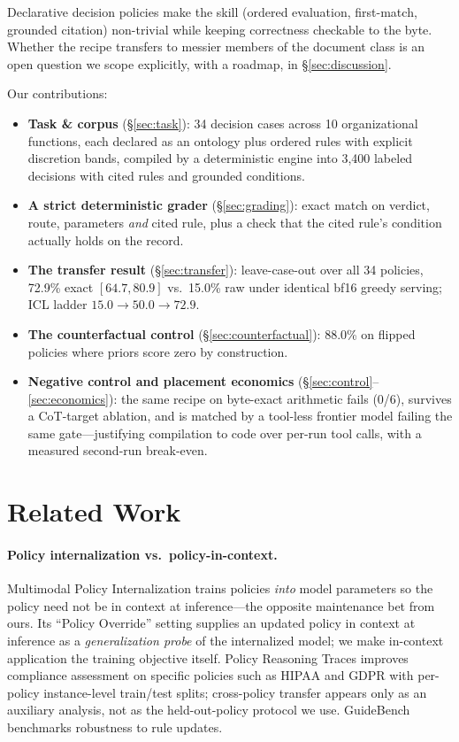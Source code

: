\documentclass[11pt]{article}
\begin{document}
Declarative decision policies make the skill (ordered evaluation, first-match, grounded citation) non-trivial while keeping correctness checkable to the byte. Whether the recipe transfers to messier members of the document class is an open question we scope explicitly, with a roadmap, in \S\ref{sec:discussion}.

Our contributions:
\begin{itemize}
  \item \textbf{Task \& corpus} (\S\ref{sec:task}): 34 decision cases across 10 organizational functions, each declared as an ontology plus ordered rules with explicit discretion bands, compiled by a deterministic engine into 3{,}400 labeled decisions with cited rules and grounded conditions.
  \item \textbf{A strict deterministic grader} (\S\ref{sec:grading}): exact match on verdict, route, parameters \emph{and} cited rule, plus a check that the cited rule's condition actually holds on the record.
  \item \textbf{The transfer result} (\S\ref{sec:transfer}): leave-case-out over all 34 policies, 72.9\% exact $[64.7, 80.9]$ vs.\ 15.0\% raw under identical bf16 greedy serving; ICL ladder $15.0 \rightarrow 50.0 \rightarrow 72.9$.
  \item \textbf{The counterfactual control} (\S\ref{sec:counterfactual}): 88.0\% on flipped policies where priors score zero by construction.
  \item \textbf{Negative control and placement economics} (\S\ref{sec:control}--\ref{sec:economics}): the same recipe on byte-exact arithmetic fails (0/6), survives a CoT-target ablation, and is matched by a tool-less frontier model failing the same gate---justifying compilation to code over per-run tool calls, with a measured second-run break-even.
\end{itemize}

\section{Related Work}

\paragraph{Policy internalization vs.\ policy-in-context.} Multimodal Policy Internalization \citep{trimpi2025} trains policies \emph{into} model parameters so the policy need not be in context at inference---the opposite maintenance bet from ours. Its ``Policy Override'' setting supplies an updated policy in context at inference as a \emph{generalization probe} of the internalized model; we make in-context application the training objective itself. Policy Reasoning Traces \citep{prt2025} improves compliance assessment on specific policies such as HIPAA and GDPR with per-policy instance-level train/test splits; cross-policy transfer appears only as an auxiliary analysis, not as the held-out-policy protocol we use. GuideBench \citep{guidebench2025} benchmarks robustness to rule updates.
\end{document}
